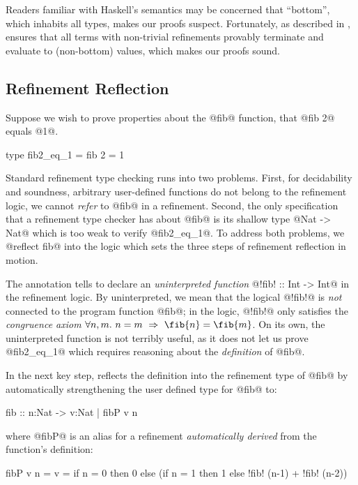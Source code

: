  Readers familiar with Haskell's
semantics may be concerned that ``bottom'', which inhabits
all types, makes our proofs suspect.
%
Fortunately, as described in \citet{Vazou14}, \toolname
ensures that all terms with non-trivial refinements
provably terminate and evaluate to (non-bottom) values,
which makes our proofs sound.

\subsection{Refinement Reflection}

Suppose we wish to prove properties about the @fib@
function, \eg that @fib 2@ equals @1@.
%
\begin{code}
    type fib2_eq_1 = { fib 2 = 1 }
\end{code}
%
Standard refinement type checking runs into two problems.
%
First, for decidability and soundness, arbitrary user-defined
functions do not belong to the refinement logic, \ie we cannot
\emph{refer} to @fib@ in a refinement.
%
Second, the only specification that a refinement type checker
has about @fib@ is its shallow type @Nat -> Nat@ which is
too weak to verify @fib2_eq_1@.
%
To address both problems, we @reflect fib@ into the logic which
sets the three steps of refinement reflection in motion.

%
The annotation tells \toolname to declare an
\emph{uninterpreted function} @!fib! :: Int -> Int@
in the refinement logic.
%
By uninterpreted, we mean that the logical @!fib!@
is \emph{not} connected to the program function
@fib@; in the logic, @!fib!@
only satisfies the \emph{congruence axiom}
%
$\forall n, m.\ n = m\ \Rightarrow\ \fib{n} = \fib{m}$.
%
On its own, the uninterpreted function is not
terribly useful, as it does not let us prove
%
@fib2_eq_1@ which requires reasoning about the
\emph{definition} of @fib@.

%
In the next key step, \toolname reflects the
definition into the refinement type of @fib@
by automatically strengthening the user defined
type for @fib@ to:
%
\begin{code}
    fib :: n:Nat -> { v:Nat | fibP v n }
\end{code}
%
where @fibP@ is an alias for a refinement
\emph{automatically derived} from the
function's definition:
%
\begin{mcode}
    fibP v n = v = if n = 0 then 0 else (if n = 1 then 1 else !fib! (n-1) + !fib! (n-2))
\end{mcode}

